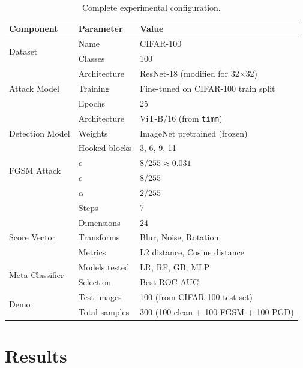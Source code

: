 \documentclass[12pt, a4paper]{article}
\begin{document}
\begin{table}[H]
\centering
\caption{Complete experimental configuration.}
\begin{tabular}{@{}lll@{}}
\toprule
\textbf{Component} & \textbf{Parameter} & \textbf{Value} \\
\midrule
\multirow{2}{*}{Dataset}
    & Name      & CIFAR-100 \\
    & Classes   & 100 \\
\midrule
\multirow{3}{*}{Attack Model}
    & Architecture & ResNet-18 (modified for 32$\times$32) \\
    & Training     & Fine-tuned on CIFAR-100 train split \\
    & Epochs       & 25 \\
\midrule
\multirow{3}{*}{Detection Model}
    & Architecture  & ViT-B/16 (from \texttt{timm}) \\
    & Weights       & ImageNet pretrained (frozen) \\
    & Hooked blocks & 3, 6, 9, 11 \\
\midrule
\multirow{2}{*}{FGSM Attack}
    & $\epsilon$  & $8/255 \approx 0.031$ \\
\midrule
\multirow{3}{*}{PGD Attack}
    & $\epsilon$  & $8/255$ \\
    & $\alpha$    & $2/255$ \\
    & Steps       & 7 \\
\midrule
\multirow{3}{*}{Score Vector}
    & Dimensions   & 24 \\
    & Transforms   & Blur, Noise, Rotation \\
    & Metrics      & L2 distance, Cosine distance \\
\midrule
\multirow{2}{*}{Meta-Classifier}
    & Models tested & LR, RF, GB, MLP \\
    & Selection     & Best ROC-AUC \\
\midrule
\multirow{2}{*}{Demo}
    & Test images   & 100 (from CIFAR-100 test set) \\
    & Total samples & 300 (100 clean + 100 FGSM + 100 PGD) \\
\bottomrule
\end{tabular}
\end{table}

\section{Results}
\end{document}
